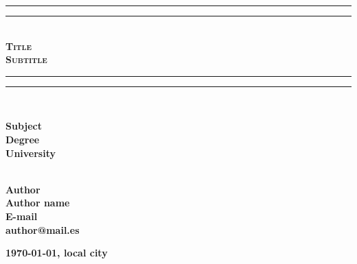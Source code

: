 \begin{titlepage}
  \centering

  \rule{\textwidth}{0.5px}\vspace*{-\baselineskip}\vspace*{2pt}
  \rule{\textwidth}{0.5px}\\[\baselineskip]

  {\scshape
    \textbf{\huge Title}\\[0.8\baselineskip]
    \textbf{\Large Subtitle}\\[0.2\baselineskip]
  }

  \rule{\textwidth}{0.5px}\vspace*{-\baselineskip}\vspace*{2pt}
  \rule{\textwidth}{0.5px}\\[\baselineskip]

  \vfill

  \textbf{
    {\LARGE Subject} \\[\baselineskip]
    Degree \\
    University
  }

  \vfill

  {\normalfont\textbf{\\
  Author\\Author name\\
  E-mail\\author@mail.es}}

  \vfill

  \textbf{\normalsize \today, local city}

  \vfill

\end{titlepage}
